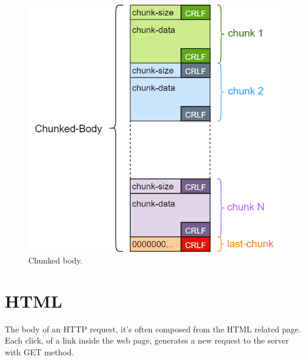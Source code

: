 \begin{figure}[h]
\centering
\includegraphics[scale=0.5]{Images/HTTP/Chunked-Body}\caption{\footnotesize{Chunked body.}}\label{chunked_body}
\end{figure}

\section{HTML}
The body of an HTTP request, it's often composed from the HTML related page. Each click, of a link inside the web page, generates a new request to the server with GET method.